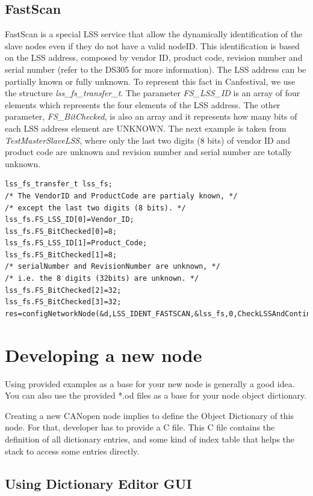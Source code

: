 \documentclass[12pt,english,a4paper]{book}
\newcommand{\canopen}{CANopen }
\begin{document}
\subsection{FastScan}
FastScan is a special LSS service that allow the dynamically identification of the slave nodes even if they do not have a valid nodeID. This identification is based on the LSS address, composed by vendor ID, product code, revision number and serial number (refer to the DS305 for more information). The LSS address can be partially known or fully unknown. To represent this fact in Canfestival, we use the structure \textit{lss\_fs\_transfer\_t}. The parameter \textit{FS\_LSS\_ID} is an array of four elements which represents the four elements of the LSS address. The other parameter, \textit{FS\_BitChecked}, is also an array and it represents how many bits of each LSS address element are UNKNOWN. The next example is taken from \textit{TestMasterSlaveLSS}, where only the last two digits (8 bits) of vendor ID and product code are unknown and revision number and serial number are totally unknown. 

\begin{verbatim}
lss_fs_transfer_t lss_fs;
/* The VendorID and ProductCode are partialy known, */
/* except the last two digits (8 bits). */
lss_fs.FS_LSS_ID[0]=Vendor_ID;
lss_fs.FS_BitChecked[0]=8;
lss_fs.FS_LSS_ID[1]=Product_Code;
lss_fs.FS_BitChecked[1]=8;
/* serialNumber and RevisionNumber are unknown, */
/* i.e. the 8 digits (32bits) are unknown. */
lss_fs.FS_BitChecked[2]=32;
lss_fs.FS_BitChecked[3]=32;
res=configNetworkNode(&d,LSS_IDENT_FASTSCAN,&lss_fs,0,CheckLSSAndContinue);
\end{verbatim}

\section{Developing a new node}

Using provided examples as a base for your new node is generally a
good idea. You can also use the provided {*}.od files as a base for
your node object dictionary.

Creating a new \canopen node implies to define the Object Dictionary
of this node. For that, developer has to provide a C file. This C
file contains the definition of all dictionary entries, and some kind
of index table that helps the stack to access some entries directly.


\subsection{Using Dictionary Editor GUI}
\end{document}
